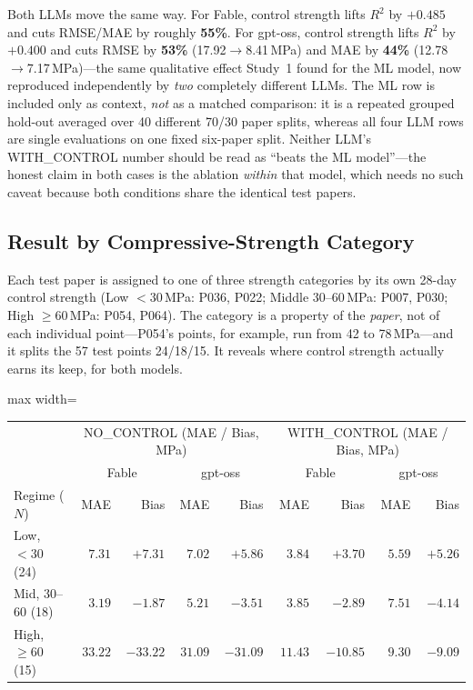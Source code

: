 \documentclass[11pt]{article}
\newcommand{\R}{$R^2$}
\begin{document}
\noindent Both LLMs move the same way. For Fable, control strength lifts \R{} by
$+0.485$ and cuts RMSE/MAE by roughly \textbf{55\%}. For gpt-oss, control strength
lifts \R{} by $+0.400$ and cuts RMSE by \textbf{53\%} (17.92$\to$8.41\,MPa) and MAE by
\textbf{44\%} (12.78$\to$7.17\,MPa)---the same qualitative effect Study~1 found for the
ML model, now reproduced independently by \emph{two} completely different LLMs. The ML
row is included only as context, \emph{not} as a matched comparison: it is a repeated
grouped hold-out averaged over 40 different 70/30 paper splits, whereas all four LLM
rows are single evaluations on one fixed six-paper split. Neither LLM's WITH\_CONTROL
number should be read as ``beats the ML model''---the honest claim in both cases is the
ablation \emph{within} that model, which needs no such caveat because both conditions
share the identical test papers.

\subsection{Result by Compressive-Strength Category}
\label{sec:part2-opus-bins}
Each test paper is assigned to one of three strength categories by its own 28-day
control strength (Low $<30$\,MPa: P036, P022; Middle $30$--$60$\,MPa: P007, P030; High
$\geq60$\,MPa: P054, P064). The category is a property of the \emph{paper}, not of each
individual point---P054's points, for example, run from 42 to 78\,MPa---and it splits
the 57 test points 24/18/15. It reveals where control strength actually earns its
keep, for both models.
\begin{center}\footnotesize
\begin{adjustbox}{max width=\linewidth}
\begin{tabular}{lrrrrrrrr}
\toprule
& \multicolumn{4}{c}{NO\_CONTROL (MAE / Bias, MPa)} & \multicolumn{4}{c}{WITH\_CONTROL (MAE / Bias, MPa)} \\
& \multicolumn{2}{c}{Fable} & \multicolumn{2}{c}{gpt-oss} & \multicolumn{2}{c}{Fable} & \multicolumn{2}{c}{gpt-oss} \\
Regime ($N$) & MAE & Bias & MAE & Bias & MAE & Bias & MAE & Bias \\
\midrule
Low, $<30$ (24) & $7.31$ & $+7.31$ & $7.02$ & $+5.86$ & $3.84$ & $+3.70$ & $5.59$ & $+5.26$ \\
Mid, $30$--$60$ (18) & $3.19$ & $-1.87$ & $5.21$ & $-3.51$ & $3.85$ & $-2.89$ & $7.51$ & $-4.14$ \\
High, $\geq60$ (15) & $33.22$ & $-33.22$ & $31.09$ & $-31.09$ & $\mathbf{11.43}$ & $-10.85$ & $\mathbf{9.30}$ & $-9.09$ \\
\bottomrule
\end{tabular}
\end{adjustbox}
\end{center}
\end{document}
